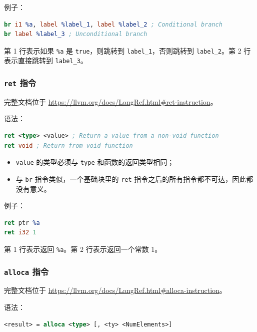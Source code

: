 例子：
\begin{lstlisting}[language=llvm]
br i1 %a, label %label_1, label %label_2 ; Conditional branch
br label %label_3 ; Unconditional branch
\end{lstlisting}

第 1 行表示如果 \texttt{\%a} 是 \texttt{true}，则跳转到
\texttt{label\_1}，否则跳转到 \texttt{label\_2}。第 2 行表示直接跳转到
\texttt{label\_3}。

\subsubsection{\texttt{ret} 指令}\label{LLVM-ret-instructions}

\begin{remark}
完整文档位于 \url{https://llvm.org/docs/LangRef.html\#ret-instruction}。
\end{remark}

语法：
\begin{lstlisting}[language=llvm]
ret <type> <value> ; Return a value from a non-void function
ret void ; Return from void function
\end{lstlisting}

\begin{itemize}
  \item \texttt{value} 的类型必须与 \texttt{type} 和函数的返回类型相同；
  \item 与 \texttt{br} 指令类似，一个基础块里的 \texttt{ret}
    指令之后的所有指令都不可达，因此都没有意义。
\end{itemize}

例子：
\begin{lstlisting}[language=llvm]
ret ptr %a
ret i32 1
\end{lstlisting}

第 1 行表示返回 \texttt{\%a}。第 2 行表示返回一个常数 1。

\subsubsection{\texttt{alloca} 指令}\label{LLVM-alloca-instructions}

\begin{remark}
完整文档位于 \url{https://llvm.org/docs/LangRef.html\#alloca-instruction}。
\end{remark}

语法：
\begin{lstlisting}[language=llvm]
<result> = alloca <type> [, <ty> <NumElements>]
\end{lstlisting}

